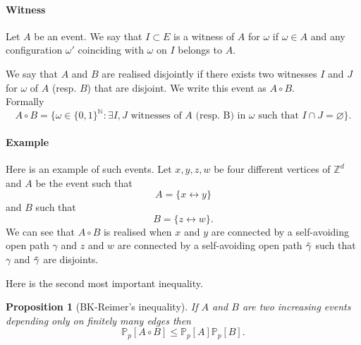 \documentclass[a4paper,11pt]{article}
\theoremstyle{plain}
\newtheorem{proposition}[theorem]{Proposition}
\theoremstyle{definition}
\theoremstyle{remark}
\begin{document}
\paragraph{Witness}
Let $A$ be an event. We say that $I \subset E$ is a witness of $A$ for $\omega$ if $\omega \in A$ and any configuration $\omega'$ coinciding with $\omega$ on $I$ belongs to $A$.

We say that $A$ and $B$ are realised disjointly if there exists two witnesses $I$ and $J$ for $\omega$ of $A$ (resp. $B$) that are disjoint.
We write this event as $A \circ B$.\\
Formally
\[ A \circ B = \{\omega \in \{ 0, 1 \}^\mathbb{N} : \exists I, J \text{ witnesses of } A \text{ (resp. B) in } \omega \text{ such that } I \cap J = \varnothing \}. \]

\paragraph{Example}
Here is an example of such events. Let $x,y,z,w$ be four different vertices of $\mathbb{Z}^d$ and $A$ be the event such that
    \[A = \{x \longleftrightarrow y\}\] and $B$ such that
    \[B = \{z \longleftrightarrow w\}.\]
We can see that $A \circ B$ is realised when $x$ and $y$ are connected by a self-avoiding open path $\gamma$ and $z$ and $w$ are connected by a self-avoiding open path $\Tilde{\gamma}$ such that $\gamma$ and $\Tilde{\gamma}$ are disjoints.

Here is the second most important inequality.
\begin{proposition}[BK-Reimer's inequality]
\label{bkreimer}
If $A$ and $B$ are two increasing events depending only on finitely many edges then
\[ \mathbb{P}_p[A \circ B] \leq \mathbb{P}_p[A]\mathbb{P}_p[B]. \]

\end{proposition}
\end{document}
